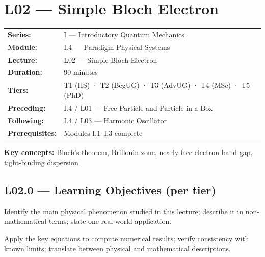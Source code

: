 \renewcommand{\lectureCode}{I.4 / L02}

\section*{L02 — Simple Bloch Electron}
\label{sec:L02}

\begin{tcolorbox}[lecturebox, title={Module I.4 / L02 — Metadata}]
\begin{tabular}{@{}ll@{}}
\textbf{Series:}    & I — Introductory Quantum Mechanics \\
\textbf{Module:}    & I.4 — Paradigm Physical Systems \\
\textbf{Lecture:}   & L02 — Simple Bloch Electron \\
\textbf{Duration:}  & 90 minutes \\
\textbf{Tiers:}     & T1 (HS) · T2 (BegUG) · T3 (AdvUG) · T4 (MSc) · T5 (PhD) \\
\textbf{Preceding:} & I.4 / L01 — Free Particle and Particle in a Box \\
\textbf{Following:} & I.4 / L03 — Harmonic Oscillator \\
\textbf{Prerequisites:} & Modules I.1–I.3 complete \\
\end{tabular}

\medskip
\textbf{Key concepts:} Bloch's theorem, Brillouin zone, nearly-free electron band gap, tight-binding dispersion
\end{tcolorbox}

\subsection*{L02.0 — Learning Objectives (per tier)}
\label{sec:L02.0}

\quad
Identify the main physical phenomenon studied in this lecture; describe it in
non-mathematical terms; state one real-world application.

\quad
Apply the key equations to compute numerical results; verify consistency with
known limits; translate between physical and mathematical descriptions.

